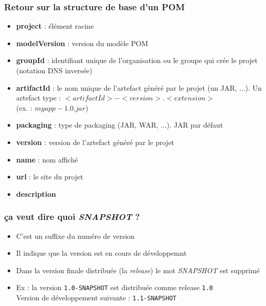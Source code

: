 \documentclass{beamer}
\begin{document}
\begin{frame}[fragile]
  \frametitle{Retour sur la structure de base d'un POM}
  \begin{itemize}
  \item \textbf{project} : élément racine
  \item \textbf{modelVersion} : version du modèle POM
  \item \textbf{groupId} : identifiant unique de l'organisation ou le
    groupe qui crée le projet (notation DNS inversée)
  \item \textbf{artifactId} : le nom unique de l'artefact généré par
    le projet (un JAR, ...). Un artefact type :
    $<artifactId>-<version>.<extension>$\\
    (ex. : $myapp-1.0.jar$)
    \item \textbf{packaging} : type de packaging (JAR, WAR, ...). JAR
      par défaut
    \item \textbf{version} : version de l'artefact généré par le
      projet
    \item \textbf{name} : nom affiché
    \item \textbf{url} : le site du projet
    \item \textbf{description}
  \end{itemize}    
\end{frame}

\begin{frame}[fragile]
  \frametitle{ça veut dire quoi \textit{SNAPSHOT} ?}
  \begin{itemize}
  \item C'est un suffixe du numéro de version
  \item Il indique que la version est en cours de développemnt
  \item Dans la version finale distribuée (la \textit{release}) le mot
    \textit{SNAPSHOT} est supprimé
  \item Ex : la version \texttt{1.0-SNAPSHOT} est distribuée comme release  \texttt{1.0}\\
    Version de développement suivante : \texttt{1.1-SNAPSHOT}
    
  \end{itemize}    
\end{frame}
\end{document}

